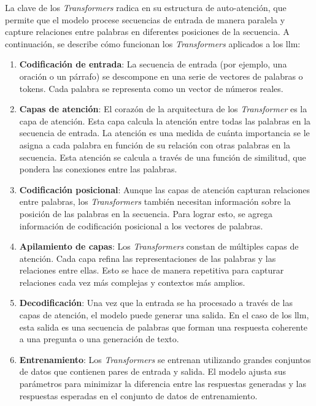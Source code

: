 La clave de los \textit{Transformers} radica en su estructura de auto-atención, que permite que el modelo procese secuencias de entrada de manera paralela y capture relaciones entre palabras en diferentes posiciones de la secuencia\cite{Techtarget_LLM}. A continuación, se describe cómo funcionan los \textit{Transformers} aplicados a los \acrshort{llm}:

\begin{enumerate}
    
\item \textbf{Codificación de entrada}: La secuencia de entrada (por ejemplo, una oración o un párrafo) se descompone en una serie de vectores de palabras o tokens. Cada palabra se representa como un vector de números reales.

\item \textbf{Capas de atención}: El corazón de la arquitectura de los \textit{Transformer} es la capa de atención. Esta capa calcula la atención entre todas las palabras en la secuencia de entrada. La atención es una medida de cuánta importancia se le asigna a cada palabra en función de su relación con otras palabras en la secuencia. Esta atención se calcula a través de una función de similitud, que pondera las conexiones entre las palabras.

\item \textbf{Codificación posicional}: Aunque las capas de atención capturan relaciones entre palabras, los \textit{Transformers} también necesitan información sobre la posición de las palabras en la secuencia. Para lograr esto, se agrega información de codificación posicional a los vectores de palabras.

\item \textbf{Apilamiento de capas}: Los \textit{Transformers} constan de múltiples capas de atención. Cada capa refina las representaciones de las palabras y las relaciones entre ellas. Esto se hace de manera repetitiva para capturar relaciones cada vez más complejas y contextos más amplios.

\item \textbf{Decodificación}: Una vez que la entrada se ha procesado a través de las capas de atención, el modelo puede generar una salida. En el caso de los \acrshort{llm}, esta salida es una secuencia de palabras que forman una respuesta coherente a una pregunta o una generación de texto.

\item \textbf{Entrenamiento}: Los \textit{Transformers} se entrenan utilizando grandes conjuntos de datos que contienen pares de entrada y salida. El modelo ajusta sus parámetros para minimizar la diferencia entre las respuestas generadas y las respuestas esperadas en el conjunto de datos de entrenamiento.

\end{enumerate}

